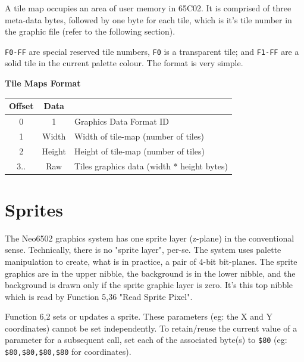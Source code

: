 \documentclass[12pt]{article}
\newcommand{\MonoSp}[1] {\fontsize{10pt}{10pt}\selectfont\texttt{#1}\normalsize}
\newcommand{\HeaderCenter}[1] {\makecell[tc]{\textbf{#1}}}
\begin{document}
A tile map occupies an area of user memory in 65C02.
It is comprised of three meta-data bytes, followed by one byte for each tile,
which is it's tile number in the graphic file (refer to the following section).
\newline

\MonoSp{F0-FF} are special reserved tile numbers,
\MonoSp{F0} is a transparent tile;
and \MonoSp{F1-FF} are a solid tile in the current palette colour.
The format is very simple.

\begin{table}[h]
\centering\textbf{Tile Maps Format} \\
\begin{tabular}{ | c | c | l | }                                                \hline
\textbf{Offset} & \textbf{Data} & \HeaderCenter{Description}                 \\ \hline
0               & 1             & Graphics Data Format ID                    \\ \hline
1               & Width         & Width of tile-map (number of tiles)        \\ \hline
2               & Height        & Height of tile-map (number of tiles)       \\ \hline
3..             & Raw           & Tiles graphics data (width * height bytes) \\ \hline
\end{tabular}
\end{table}


\pagebreak


\section{Sprites}\label{sprite}

The Neo6502 graphics system has one sprite layer (z-plane) in the conventional sense.
Technically, there is no "sprite layer", per-se.
The system uses palette manipulation to create, what is in practice,
a pair of 4-bit bit-planes.
The sprite graphics are in the upper nibble, the background is in the lower nibble,
and the background is drawn only if the sprite graphic layer is zero.
It's this top nibble which is read by Function 5,36 "Read Sprite Pixel".
\newline

Function 6,2 sets or updates a sprite.
These parameters (eg: the X and Y coordinates) cannot be set independently.
To retain/reuse the current value of a parameter for a subsequent call,
set each of the associated byte(s) to \MonoSp{\$80}
(eg: \MonoSp{\$80,\$80,\$80,\$80} for coordinates).
\newline
\end{document}

